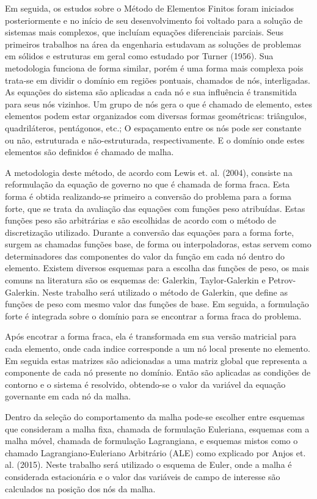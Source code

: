 Em seguida, os estudos sobre o Método de Elementos Finitos foram iniciados posteriormente e no início de seu desenvolvimento foi voltado para a solução de sistemas mais complexos, que incluíam equações diferenciais parciais.
Seus primeiros trabalhos na área da engenharia estudavam as soluções de problemas em sólidos e estruturas em geral como estudado por Turner (1956)\cite{Turner-1956}.
Sua metodologia funciona de forma similar, porém é uma forma mais complexa pois trata-se em dividir o domínio em regiões pontuais, chamados de nós, interligadas.
As equações do sistema são aplicadas a cada nó e sua influência é transmitida para seus nós vizinhos.
Um grupo de nós gera o que é chamado de elemento, estes elementos podem estar organizados com diversas formas geométricas: triângulos, quadriláteros, pentágonos, etc.;
O espaçamento entre os nós pode ser constante ou não, estruturada e não-estruturada, respectivamente.
E o domínio onde estes elementos são definidos é chamado de malha.

A metodologia deste método, de acordo com Lewis et. al. (2004)\cite{lewis}, consiste na reformulação da equação de governo no que é chamada de forma fraca.
Esta forma é obtida realizando-se primeiro a conversão do problema para a forma forte, que se trata da avaliação das equações com funções peso atribuídas.
Estas funções peso são arbitrárias e são escolhidas de acordo com o método de discretização utilizado.
Durante a conversão das equações para a forma forte, surgem as chamadas funções base, de forma ou interpoladoras, estas servem como determinadores das componentes do valor da função em cada nó dentro do elemento.
Existem diversos esquemas para a escolha das funções de peso, os mais comuns na literatura são os esquemas de: Galerkin, Taylor-Galerkin e Petrov-Galerkin.
Neste trabalho será utilizado o método de Galerkin, que define as funções de peso com mesmo valor das funções de base.
Em seguida, a formulação forte é integrada sobre o domínio para se encontrar a forma fraca do problema.

Após encotrar a forma fraca, ela é transformada em sua versão matricial para cada elemento, onde cada indice corresponde a um nó local presente no elemento.
Em seguida estas matrizes são adicionadas a uma matriz global que representa a componente de cada nó presente no domínio.
Então são aplicadas as condições de contorno e o sistema é resolvido, obtendo-se o valor da variável da equação governante em cada nó da malha.

Dentro da seleção do comportamento da malha pode-se escolher entre esquemas que consideram a malha fixa, chamada de formulação Euleriana, esquemas com a malha móvel, chamada de formulação Lagrangiana, e esquemas mistos como o chamado Lagrangiano-Euleriano Arbitrário (ALE) como explicado por Anjos et. al. (2015)\cite{ALE-2015}.
Neste trabalho será utilizado o esquema de Euler, onde a malha é considerada estacionária e o valor das variáveis de campo de interesse são calculados na posição dos nós da malha.

